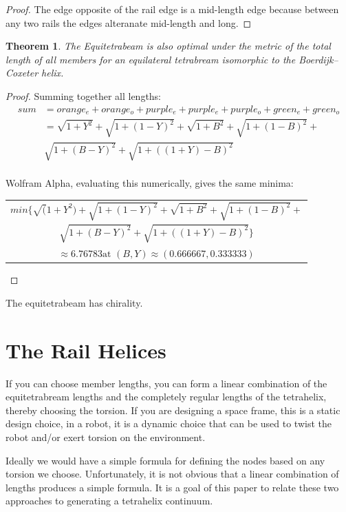 \documentclass[11pt]{article}
\newtheorem{theorem}{Theorem}
\begin{document}
\begin{proof}
The edge opposite of the rail edge is a mid-length edge because between any two rails the edges alteranate mid-length and long.
  \end{proof}


\begin{theorem}
  The Equitetrabeam is also optimal under the metric of the total length of all members 
  for an equilateral tetrabream isomorphic to the Boerdijk--Coxeter helix.
\end{theorem}

\begin{proof}
  Summing together all lengths:
  \begin{align*}
  sum &= orange_e + orange_o + purple_e + purple_e + purple_o + green_e + green_o \\    
  &= \sqrt{1 + Y^2} + \sqrt{1 + (1-Y)^2} + \sqrt{1 + B^2} + \sqrt{1+ (1-B)^2} + \\
  & \sqrt{1 + (B - Y)^2} +  \sqrt{1 + ((1+Y) - B)^2} \\
  \end{align*} 

  Wolfram Alpha, evaluating this numerically, gives the same minima:
  
  \begin{tabular}{c}    
$  min\{\sqrt(1 + Y^2) + \sqrt{1 + (1 - Y)^2} + \sqrt{1 + B^2} + \sqrt{1 + (1 - B)^2} + $\\
    $  \sqrt{1 + (B - Y)^2} + \sqrt{1 + ((1 + Y) - B)^2}\} $ \\
    $ \approx 6.76783 \text{at } (B, Y) \approx (0.666667, 0.333333) $
  \end{tabular}

  
\end{proof}

The equitetrabeam has chirality.

\section{The Rail Helices}

If you can choose member lengths, you can form a linear combination of the equitetrabream lengths and the completely regular
lengths of the tetrahelix, thereby choosing the torsion.  If you are designing a space frame, this is a static design choice,
in a robot, it is a dynamic choice that can be used to twist the robot and/or exert torsion on the environment.

Ideally we would have a simple formula for defining the nodes based on any torsion we choose.
Unfortunately, it is not obvious that a linear combination of lengths produces a simple formula.
It is a goal of this paper to relate these two approaches to generating a tetrahelix continuum.
\end{document}
